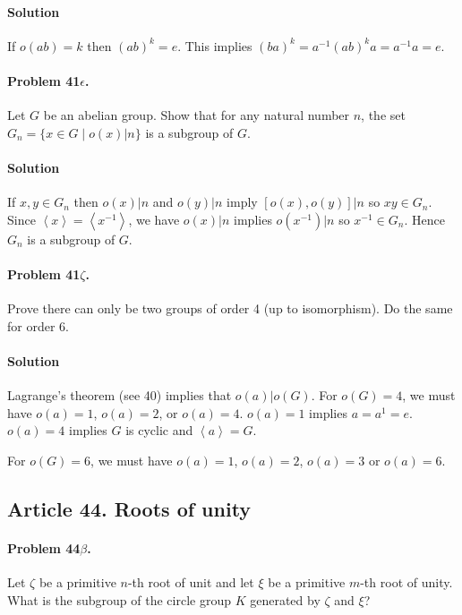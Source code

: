 \paragraph*{Solution}
If $o(ab) = k$ then $(ab)^k = e$. This implies $(ba)^k = a^{-1}(ab)^k a = a^{-1}a = e$.

\paragraph{Problem 41$\epsilon$.}
Let $G$ be an abelian group. Show that for any natural number $n$, the set $G_n
= \{ x \in G \mid o(x) | n \}$ is a subgroup of $G$.

\paragraph*{Solution}
If $x, y \in G_n$ then $o(x) | n$ and $o(y) | n$ imply $[o(x), o(y)] | n$ so
$xy \in G_n$. Since $\left<x\right> = \left<x^{-1}\right>$, we have $o(x) | n$ implies $o(x^{-1}) | n$
so $x^{-1} \in G_n$. Hence $G_n$ is a subgroup of $G$.

\paragraph{Problem 41$\zeta$.}
Prove there can only be two groups of order 4 (up to isomorphism). Do the same
for order 6.

\paragraph*{Solution}
Lagrange's theorem (see 40) implies that $o(a) | o(G)$. For $o(G)=4$, we must have
$o(a)=1$, $o(a)=2$, or $o(a)=4$. $o(a)=1$ implies $a=a^1=e$. $o(a)=4$ implies
$G$ is cyclic and $\left<a\right> = G$.

For $o(G)=6$, we must have $o(a)=1$, $o(a)=2$, $o(a)=3$ or $o(a)=6$.

\subsection{Article 44. Roots of unity}

\paragraph{Problem 44$\beta$.}
Let $\zeta$ be a primitive $n$-th root of unit and let $\xi$ be a primitive
$m$-th root of unity. What is the subgroup of the circle group $K$ generated
by $\zeta$ and $\xi$?

